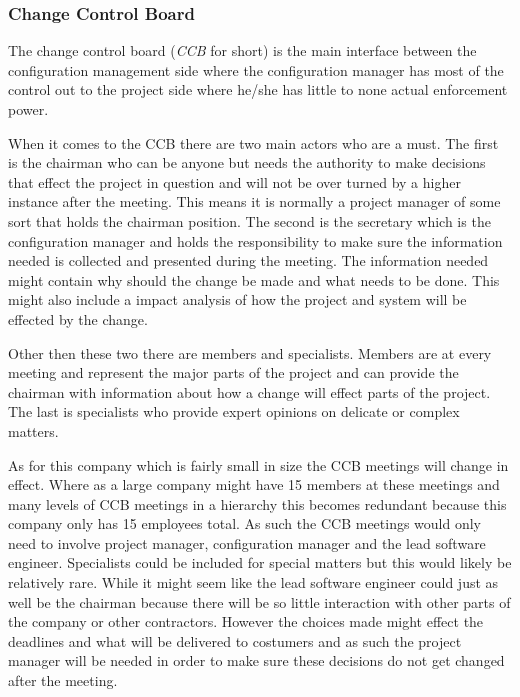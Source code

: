 \documentclass[a4paper]{article}
\begin{document}
\subsubsection{Change Control Board}\label{CCB}
The change control board (\emph{CCB} for short) is the main interface between the configuration management side where the configuration manager has most of the control out to the project side where he/she has little to none actual enforcement power. 

When it comes to the CCB there are two main actors who are a must. The first is the chairman who can be anyone but needs the authority to make decisions that effect the project in question and will not be over turned by a higher instance after the meeting. This means it is normally a project manager of some sort that holds the chairman position. The second is the secretary which is the configuration manager and holds the responsibility to make sure the information needed is collected and presented during the meeting. The information needed might contain why should the change be made and what needs to be done. This might also include a impact analysis of how the project and system will be effected by the change.

Other then these two there are members and specialists. Members are at every meeting and represent the major parts of the project and can provide the chairman with information about how a change will effect parts of the project. The last is specialists who provide expert opinions on delicate or complex matters.

As for this company which is fairly small in size the CCB meetings will change in effect. Where as a large company might have 15 members at these meetings and many levels of CCB meetings in a hierarchy this becomes redundant because this company only has 15 employees total. As such the CCB meetings would only need to involve project manager, configuration manager and the lead software engineer. Specialists could be included for special matters but this would likely be relatively rare. While it might seem like the lead software engineer could just as well be the chairman because there will be so little interaction with other parts of the company or other contractors. However the choices made might effect the deadlines and what will be delivered to costumers and as such the project manager will be needed in order to make sure these decisions do not get changed after the meeting.
\end{document}
